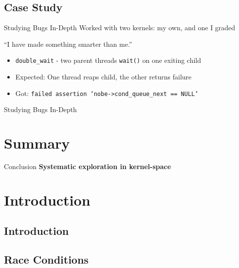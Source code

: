 \documentclass[xcolor=dvipsnames]{beamer}
\begin{document}
\subsection{Case Study}

\begin{frame}{Studying Bugs In-Depth} %
	Worked with two kernels: my own, and one I graded

	``I have made something smarter than me.''
	\begin{itemize}
		\item \texttt{double\_wait} - two parent threads \texttt{wait()} on one exiting child
		\item Expected: One thread reaps child, the other returns failure
		\item Got: \texttt{failed assertion `nobe->cond\_queue\_next == NULL'}
	\end{itemize}
\end{frame}

\begin{frame}{Studying Bugs In-Depth} %
\end{frame}

\section{Summary}

\begin{frame}{Conclusion}
	\textbf{Systematic exploration in kernel-space}
\end{frame}


\section{Introduction}
\subsection{Introduction}

\subsection{Race Conditions}
\end{document}
